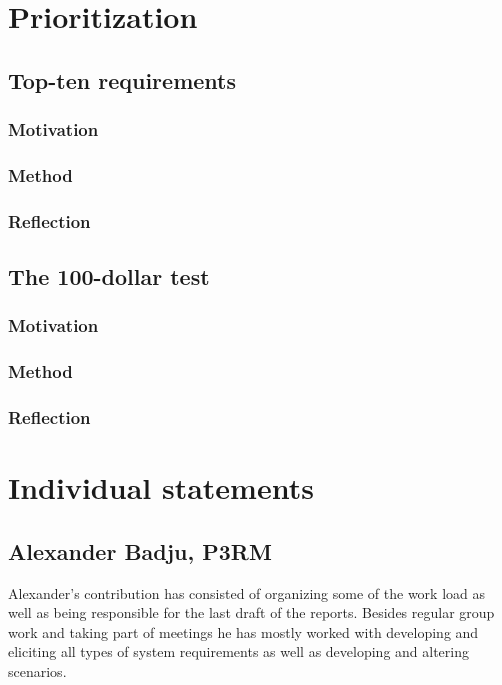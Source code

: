 \documentclass[10pt]{article}
\begin{document}
\section{Prioritization}

\subsection{Top-ten requirements}
\subsubsection{Motivation}
\subsubsection{Method}
\subsubsection{Reflection}

\subsection{The 100-dollar test}
\subsubsection{Motivation}
\subsubsection{Method}
\subsubsection{Reflection}


\section{Individual statements}
\noindent
\subsection{Alexander Badju, P3RM}
Alexander's contribution has consisted of organizing some of the work load as well as being responsible for the last draft of the reports. Besides regular group work and taking part of meetings he has mostly worked with developing and eliciting all types of system requirements as well as developing and altering scenarios. 
\end{document}
